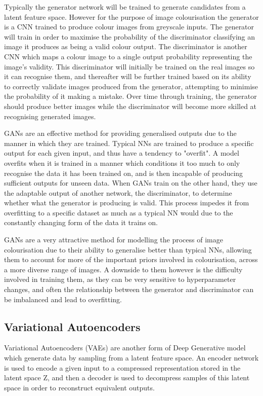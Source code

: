 \documentclass{l4proj}
\begin{document}
Typically the generator network will be trained to generate candidates from a latent feature space. However for the purpose of image colourisation the generator is a CNN trained to produce colour images from greyscale inputs. The generator will train in order to maximise the probability of the discriminator classifying an image it produces as being a valid colour output. The discriminator is another CNN which maps a colour image to a single output probability representing the image's validity. This discriminator will initially be trained on the real images so it can recognise them, and thereafter will be further trained based on its ability to correctly validate images produced from the generator, attempting to minimise the probability of it making a mistake. Over time through training, the generator should produce better images while the discriminator will become more skilled at recognising generated images.

GANs are an effective method for providing generalised outputs due to the manner in which they are trained. Typical NNs are trained to produce a specific output for each given input, and thus have a tendency to "overfit". A model overfits when it is trained in a manner which conditions it too much to only recognise the data it has been trained on, and is then incapable of producing sufficient outputs for unseen data. When GANs train on the other hand, they use the adaptable output of another network, the discriminator, to determine whether what the generator is producing is valid. This process impedes it from overfitting to a specific dataset as much as a typical NN would due to the constantly changing form of the data it trains on. 

GANs are a very attractive method for modelling the process of image colourisation due to their ability to generalise better than typical NNs, allowing them to account for more of the important priors involved in colourisation, across a more diverse range of images. A downside to them however is the difficulty involved in training them, as they can be very sensitive to hyperparameter changes, and often the relationship between the generator and discriminator can be imbalanced and lead to overfitting. 
\subsection{Variational Autoencoders}
\label{vae}
Variational Autoencoders (VAEs) are another form of Deep Generative model which generate data by sampling from a latent feature space. An encoder network is used to encode a given input to a compressed representation stored in the latent space Z, and then a decoder is used to decompress samples of this latent space in order to reconstruct equivalent outputs\cite{VAE}.
\end{document}
